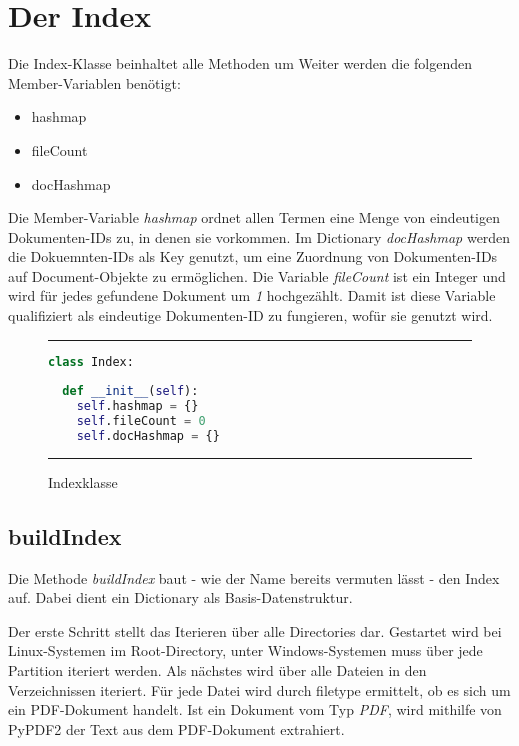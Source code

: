\section{Der Index}\label{der-index}

Die Index-Klasse beinhaltet alle Methoden um 
Weiter werden die folgenden Member-Variablen benötigt:

\begin{itemize}
	\item hashmap
	\item fileCount
	\item docHashmap
\end{itemize}

Die Member-Variable \emph{hashmap} ordnet allen Termen eine Menge von eindeutigen Dokumenten-IDs zu, in denen sie vorkommen. Im Dictionary \emph{docHashmap} werden die Dokuemnten-IDs als Key genutzt, um eine Zuordnung von Dokumenten-IDs auf Document-Objekte zu ermöglichen. Die Variable \emph{fileCount} ist ein Integer und wird für jedes gefundene Dokument um \emph{1} hochgezählt. Damit ist diese Variable qualifiziert als eindeutige Dokumenten-ID zu fungieren, wofür sie genutzt wird.

\begin{figure}[h]
	\rule{\textwidth}{0.4pt}
		\begin{lstlisting}[language=Python]
class Index:
  
  def __init__(self):
    self.hashmap = {}
    self.fileCount = 0
    self.docHashmap = {}
		\end{lstlisting}
	\rule{\textwidth}{0.4pt}
	\caption{Indexklasse}
	\label{fig:index}
\end{figure}

\subsection{buildIndex}\label{buildindex}

Die Methode \emph{buildIndex} baut - wie der Name bereits vermuten lässt - den Index auf. Dabei dient ein Dictionary als Basis-Datenstruktur.

Der erste Schritt stellt das Iterieren über alle Directories dar. Gestartet wird bei Linux-Systemen im Root-Directory, unter Windows-Systemen muss über jede Partition iteriert werden. Als nächstes wird über alle Dateien in den Verzeichnissen iteriert. Für jede Datei wird durch filetype ermittelt, ob es sich um ein PDF-Dokument handelt. Ist ein Dokument vom Typ \emph{PDF}, wird mithilfe von PyPDF2 der Text aus dem PDF-Dokument extrahiert.

